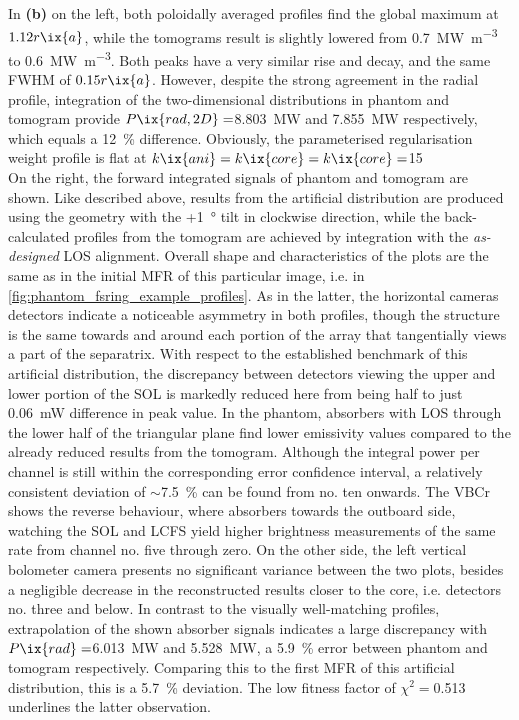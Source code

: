             In \textbf{(b)} on the left, both poloidally averaged profiles find the global maximum at $1.12r\ix{a}$, while the tomograms result is slightly lowered from \SI{0.7}{\mega\watt\per\cubic\meter} to \SI{0.6}{\mega\watt\per\cubic\meter}. Both peaks have a very similar rise and decay, and the same FWHM of $0.15r\ix{a}$. However, despite the strong agreement in the radial profile, integration of the two-dimensional distributions in phantom and tomogram provide $P\ix{rad,2D}=$\SI{8.803}{\mega\watt} and \SI{7.855}{\mega\watt} respectively, which equals a \SI{12}{\percent} difference. Obviously, the parameterised regularisation weight profile is flat at $k\ix{ani}=k\ix{core}=k\ix{core}=$\SI{15}{\arbitraryunit}\\%
            On the right, the forward integrated signals of phantom and tomogram are shown. Like described above, results from the artificial distribution are produced using the geometry with the +\SI{1}{\degree} tilt in clockwise direction, while the back-calculated profiles from the tomogram are achieved by integration with the \textit{as-designed} LOS alignment. Overall shape and characteristics of the plots are the same as in the initial MFR of this particular image, i.e. in \cref{fig:phantom_fsring_example_profiles}. As in the latter, the horizontal cameras detectors indicate a noticeable asymmetry in both profiles, though the structure is the same towards and around each portion of the array that tangentially views a part of the separatrix. With respect to the established benchmark of this artificial distribution, the discrepancy between detectors viewing the upper and lower portion of the SOL is markedly reduced here from being half to just \SI{0.06}{\milli\watt} difference in peak value. In the phantom, absorbers with LOS through the lower half of the triangular plane find lower emissivity values compared to the already reduced results from the tomogram. Although the integral power per channel is still within the corresponding error confidence interval, a relatively consistent deviation of $\sim$\SI{7.5}{\percent} can be found from no. ten onwards. The VBCr shows the reverse behaviour, where absorbers towards the outboard side, watching the SOL and LCFS yield higher brightness measurements of the same rate from channel no. five through zero. On the other side, the left vertical bolometer camera presents no significant variance between the two plots, besides a negligible decrease in the reconstructed results closer to the core, i.e. detectors no. three and below. In contrast to the visually well-matching profiles, extrapolation of the shown absorber signals indicates a large discrepancy with $P\ix{rad}=$\SI{6.013}{\mega\watt} and \SI{5.528}{\mega\watt}, a \SI{5.9}{\percent} error between phantom and tomogram respectively. Comparing this to the first MFR of this artificial distribution, this is a \SI{5.7}{\percent} deviation. The low fitness factor of $\chi^{2}=$\SI{0.513}{\arbitraryunit} underlines the latter observation.\\%

